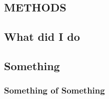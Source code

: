 
\begin{center}
\section{METHODS}
\label{sec:Methods}
\end{center}
\noindent
\indent \lipsum[1-3]
\aboveSubSecSkip
\subsection{What did I do}
\label{sec:Methods-What-did-i-do}
\noindent
	\indent \lipsum[1-2]
\belowSubSecSkip
\subsection{Something}
\label{sec:Methods-something}
\noindent
	\indent \lipsum[1]

\subsubsection{Something of Something}
\label{sec:Mechanics-yeah}

\noindent
	\indent \lipsum[2-4]
